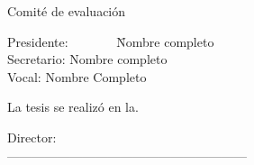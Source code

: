 
\begin{prologo}{Comité de evaluación}

	\begin{tabbing}
	Presidente: \ \ \ \ \ \ \ \= {Nombre completo}\\ [3mm]
	Secretario: \> {Nombre completo}\\ [3mm]
	Vocal: \> {Nombre Completo}\\ [3mm]
    \end{tabbing}
La tesis se realizó en la.
\vspace{15mm}
\begin{center}
	Director:\\[4mm]

	---------------------------------------------------------\\
\end{center}
\vfill

\end{prologo}




